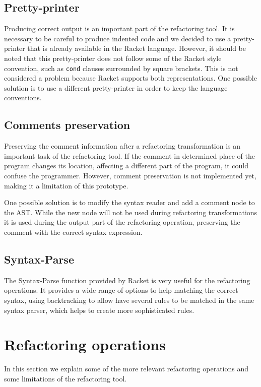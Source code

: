 \subsection{Pretty-printer}
Producing correct output is an important part of the refactoring tool.
It is necessary to be careful to produce indented code and we decided
to use a pretty-printer that is already available in the Racket
language.  However, it should be noted that this pretty-printer does
not follow some of the Racket style convention, such as {\tt cond}
clauses surrounded by square brackets. This is not considered a
problem because Racket supports both representations.  One possible
solution is to use a different pretty-printer in order to keep the
language conventions.


\subsection{Comments preservation}
Preserving the comment information after a refactoring transformation
is an important task of the refactoring tool. If the comment in
determined place of the program changes its location, affecting a
different part of the program, it could confuse the programmer.
However, comment preservation is not implemented yet, making it a
limitation of this prototype.

One possible solution is to modify the syntax reader and add a comment
node to the AST.  While the new node will not be used during
refactoring transformations it is used during the output part of the
refactoring operation, preserving the comment with the correct syntax
expression.


\subsection{Syntax-Parse}

The Syntax-Parse\cite{tobin2011languages} function provided by Racket
is very useful for the refactoring operations. It provides a wide
range of options to help matching the correct syntax,
using %
backtracking to allow have several rules to be matched in the same
syntax parser, which helps to create more sophisticated rules.

\section{Refactoring operations}
In this section we explain some of the  more relevant refactoring operations and
some limitations of the refactoring tool.

